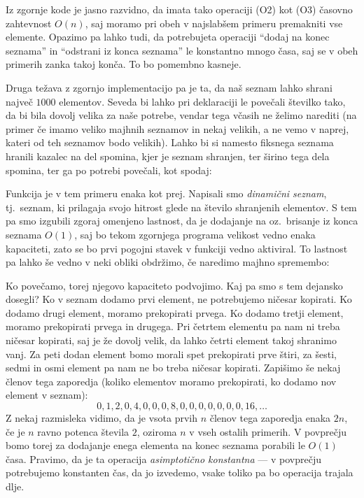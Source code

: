 
Iz zgornje kode je jasno razvidno, da imata tako operaciji (O2) kot (O3) časovno
zahtevnost $O(n)$, saj moramo pri obeh v najslabšem primeru premakniti vse
elemente.
Opazimo pa lahko tudi, da potrebujeta operaciji \enquote{dodaj na konec seznama}
in \enquote{odstrani iz konca seznama} le konstantno mnogo časa, saj se v obeh
primerih zanka takoj konča.
To bo pomembno kasneje.

Druga težava z zgornjo implementacijo pa je ta, da naš seznam lahko shrani
največ $1000$ elementov.
Seveda bi lahko pri deklaraciji  le povečali številko tako,
da bi bila dovolj velika za naše potrebe, vendar tega včasih ne želimo narediti
(na primer če imamo veliko majhnih seznamov in nekaj velikih, a ne vemo v
naprej, kateri od teh seznamov bodo velikih).
Lahko bi si namesto fiksnega seznama  hranili kazalec na del spomina,
kjer je seznam shranjen, ter širino tega dela spomina, ter ga po potrebi
povečali, kot spodaj:


Funkcija  je v tem primeru enaka kot prej.
Napisali smo \emph{dinamični seznam}, tj.~seznam, ki prilagaja svojo hitrost
glede na število shranjenih elementov.
S tem pa smo izgubili zgoraj omenjeno lastnost, da je dodajanje na oz.~brisanje
iz konca seznama $O(1)$, saj bo tekom zgornjega programa velikost vedno enaka
kapaciteti, zato se bo prvi pogojni stavek v funkciji vedno aktiviral.
To lastnost pa lahko še vedno v neki obliki obdržimo, če naredimo majhno
spremembo:


Ko  povečamo, torej njegovo kapaciteto podvojimo.
Kaj pa smo s tem dejansko dosegli?
Ko v seznam dodamo prvi element, ne potrebujemo ničesar kopirati.
Ko dodamo drugi element, moramo prekopirati prvega.
Ko dodamo tretji element, moramo prekopirati prvega in drugega.
Pri četrtem elementu pa nam ni treba ničesar kopirati, saj je  že
dovolj velik, da lahko četrti element takoj shranimo vanj.
Za peti dodan element bomo morali spet prekopirati prve štiri, za šesti, sedmi
in osmi element pa nam ne bo treba ničesar kopirati.
Zapišimo še nekaj členov tega zaporedja (koliko elementov moramo prekopirati, ko
dodamo nov element v seznam):
\[
  0, 1, 2, 0, 4, 0, 0, 0, 8, 0, 0, 0, 0, 0, 0, 0, 16, \ldots
\]
Z nekaj razmisleka vidimo, da je vsota prvih $n$ členov tega zaporedja enaka
$2n$, če je $n$ ravno potenca števila $2$, oziroma $n$ v vseh ostalih primerih.
V povprečju bomo torej za dodajanje enega elementa na konec seznama porabili le
$O(1)$ časa.
Pravimo, da je ta operacija \emph{asimptotično konstantna} --- v povprečju
potrebujemo konstanten čas, da jo izvedemo, vsake toliko pa bo operacija trajala
dlje.

